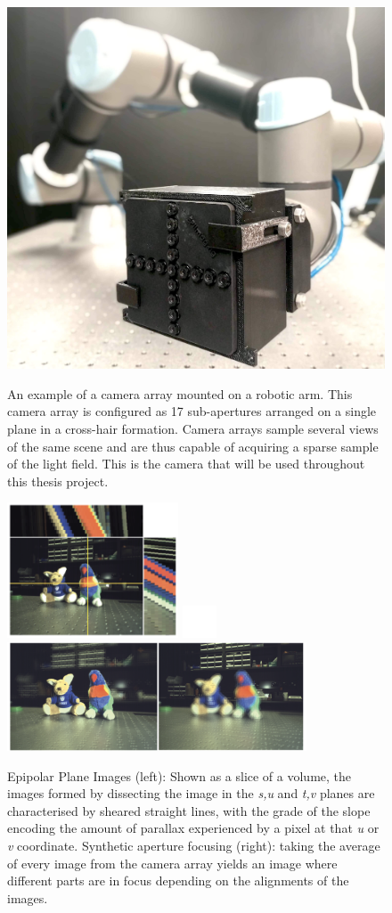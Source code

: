 \documentclass[openany]{book}
\begin{document}
\begin{figure}[tbp]
    \centering
    \includegraphics[width=4.5in]{images/robotcamera.jpg}
    \caption{An example of a camera array mounted on a robotic arm. This camera array is configured as 17 sub-apertures arranged on a single plane in a cross-hair formation. Camera arrays sample several views of the same scene and are thus capable of acquiring a sparse sample of the light field. This is the camera that will be used throughout this thesis project.}
    \label{cameraarray}
    \vspace{1cm}
    \includegraphics[width=2in]{images/epipolarimage.png}
    \includegraphics[width=0.4in]{images/blank.png}
    \includegraphics[width=3.5in]{images/refocus.png}
    \caption{Epipolar Plane Images (left): Shown as a slice of a volume, the images formed by dissecting the image in the \textit{s,u} and \textit{t,v} planes are characterised by sheared straight lines, with the grade of the slope encoding the amount of parallax experienced by a pixel at that \textit{u} or \textit{v} coordinate. Synthetic aperture focusing (right): taking the average of every image from the camera array yields an image where different parts are in focus depending on the alignments of the images.}
    \label{epiplaneimg}
\end{figure}
\end{document}
